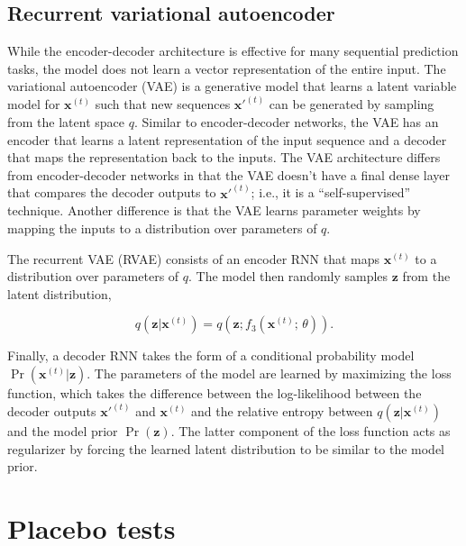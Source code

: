 \subsection{Recurrent variational autoencoder}

While the encoder-decoder architecture is effective for many sequential prediction tasks, the model does not learn a vector representation of the entire input. The variational autoencoder (VAE) \citep{kingma2013auto} is a generative model that learns a latent variable model for $\boldsymbol{x}^{(t)}$ such that new sequences $\boldsymbol{x'}^{(t)}$ can be generated by sampling from the latent space $q$. Similar to encoder-decoder networks, the VAE has an encoder that learns a latent representation of the input sequence and a decoder that maps the representation back to the inputs. The VAE architecture differs from encoder-decoder networks in that the VAE doesn't have a final dense layer that compares the decoder outputs to  $\boldsymbol{x'}^{(t)}$; i.e., it is a ``self-supervised'' technique. Another difference is that the VAE learns parameter weights by mapping the inputs to a distribution over parameters of $q$.

The recurrent VAE (RVAE) \citep{fabius2014variational, chung2015recurrent,bowman2015generating} consists of an encoder RNN that maps $\boldsymbol{x}^{(t)}$ to a distribution over parameters of $q$. The model then randomly samples $\boldsymbol{z}$ from the latent distribution, 

\begin{equation}
	q(\boldsymbol{z} | \boldsymbol{x}^{(t)}) = q (\boldsymbol{z}; f_3 (\boldsymbol{x}^{(t)};\, \theta)).
\end{equation}

Finally, a decoder RNN takes the form of a conditional probability model $\Pr (\boldsymbol{x}^{(t)} | \boldsymbol{z})$. The parameters of the model are learned by maximizing the loss function, which takes the difference between the log-likelihood between the decoder outputs $\boldsymbol{x'}^{(t)}$ and $\boldsymbol{x}^{(t)}$ and the relative entropy between  $q(\boldsymbol{z} | \boldsymbol{x}^{(t)})$ and the model prior $\Pr (\boldsymbol{z})$. The latter component of the loss function acts as regularizer by forcing the learned latent distribution to be similar to the model prior. 

\section{Placebo tests} \label{placebo}

